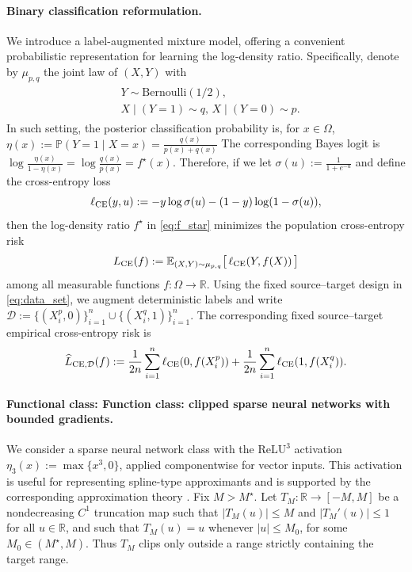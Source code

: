 \documentclass[11pt]{article}
\newcommand{\R}{\mathbb{R}}
\newcommand{\E}{\mathbb{E}}
\newcommand{\PP}{\mathbb{P}}
\theoremstyle{plain}
\theoremstyle{definition}
\theoremstyle{remark}
\begin{document}
\paragraph{Binary classification reformulation.}
We introduce a label-augmented mixture model,
offering a convenient probabilistic representation for learning the log-density ratio. Specifically, denote by $\mu_{p,q}$ the joint law of $(X,Y)$ with
\begin{eqnarray}\label{eq: label ovservation model}
\begin{aligned}
    &  Y \sim\mathrm{Bernoulli}(1/2),\\
  &     X\mid(Y=1)\sim q,\,
  X\mid(Y=0)\sim p.
\end{aligned}
\end{eqnarray}
In such setting, the
posterior classification probability is, for $x\in \Omega$,
$
  \eta(x):= \PP(Y=1\mid X=x)
  = \frac{q(x)}{p(x)+q(x)}
$
The corresponding Bayes logit is $ \log\frac{\eta(x)}{1-\eta(x)}
  = \log\frac{q(x)}{p(x)} = f^\star(x).$
Therefore, if we let $\sigma(u):=\frac{1}{1+e^{-u}}$ and define the cross-entropy loss
\[
  \ell_{\rm CE}(y,u):= -y\log\sigma(u)-(1-y)\log(1-\sigma(u)),
\]
then the log-density ratio \(f^\star\) in \eqref{eq:f_star} minimizes the population cross-entropy risk
\[
  L_{\rm CE}(f):= \E_{(X,Y)\sim\mu_{p,q}}
     \big[\,\ell_{\rm CE}(Y,f(X))\,\big]
\]
among all measurable functions $f:\Omega\to\R$.
Using the fixed source--target design in \eqref{eq:data_set}, we augment
deterministic labels and write
$
\mathcal D:=
\{(X_i^p,0)\}_{i=1}^n
\cup
\{(X_i^q,1)\}_{i=1}^n
$.
The corresponding fixed source--target
empirical cross-entropy risk is
\[
  \widehat L_{\rm CE,\mathcal D}(f):=
  \frac{1}{2n}\sum_{i=1}^{n}\ell_{\rm CE}(0,f(X_i^p))
  +
  \frac{1}{2n}\sum_{i=1}^{n}\ell_{\rm CE}(1,f(X_i^q)).
\]

\paragraph{Functional class: Function class: clipped sparse neural networks with bounded gradients.}
We consider a sparse neural network class
\cite{schmidt2020nonparametric,suzuki2018adaptivity,farrell2021deep}
with the $\mathrm{ReLU}^3$ activation $\eta_3(x):=\max\{x^3,0\}$, applied componentwise for vector inputs. This activation is useful for representing spline-type approximants and is supported by the corresponding approximation theory \cite{lu2021machine}. Fix $M>M^\star$. Let $T_M:\mathbb R\to[-M,M]$ be a nondecreasing $C^1$ truncation map such that $|T_M(u)|\le M$ and $|T_M'(u)|\le1$ for all $u\in\mathbb R$, and such that $T_M(u)=u$ whenever $|u|\le M_0$, for some $M_0\in(M^\star,M)$. Thus $T_M$ clips only outside a range strictly containing the target range.
\end{document}
